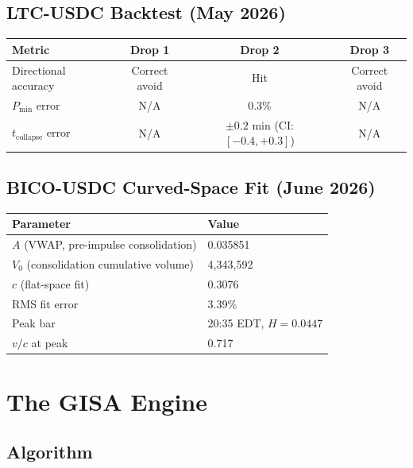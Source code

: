 \documentclass[12pt,a4paper]{article}
\begin{document}
\subsection{LTC-USDC Backtest (May 2026)}

\begin{center}
\begin{tabular}{lccc}
\toprule
Metric & Drop 1 & Drop 2 & Drop 3 \\
\midrule
Directional accuracy & Correct avoid & Hit & Correct avoid \\
$P_\text{min}$ error & N/A & 0.3\% & N/A \\
$t_\text{collapse}$ error & N/A & $\pm0.2$ min (CI: $[-0.4,+0.3]$) & N/A \\
\bottomrule
\end{tabular}
\end{center}

\subsection{BICO-USDC Curved-Space Fit (June 2026)}

\begin{center}
\begin{tabular}{ll}
\toprule
Parameter & Value \\
\midrule
$A$ (VWAP, pre-impulse consolidation) & 0.035851 \\
$V_0$ (consolidation cumulative volume) & 4{,}343{,}592 \\
$c$ (flat-space fit) & 0.3076 \\
RMS fit error & 3.39\% \\
Peak bar & 20:35 EDT, $H=0.0447$ \\
$v/c$ at peak & 0.717 \\
\bottomrule
\end{tabular}
\end{center}


\section{The GISA Engine}

\subsection{Algorithm}
\end{document}
